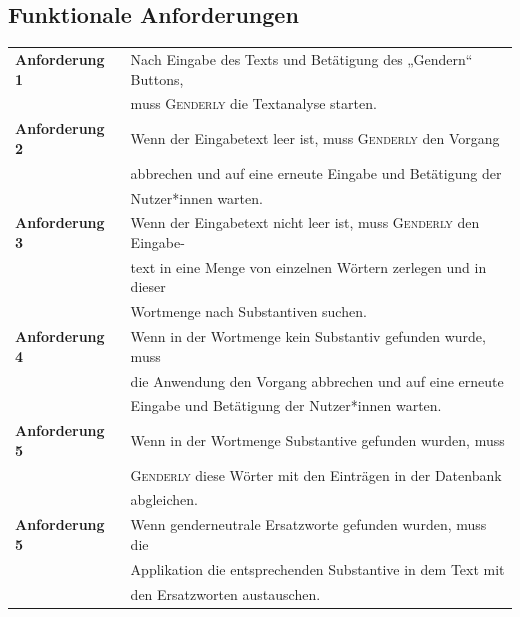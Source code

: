 \documentclass[paper=a4, parskip=half]{scrreprt}
\newcommand{\Genderly}{\textsc{Genderly}}
\begin{document}
\subsection{Funktionale Anforderungen}
\begin{table}[!htb]
\begin{tabular}{ll}
\textbf{Anforderung 1} & Nach Eingabe des Texts und Betätigung des „Gendern“ Buttons, \\
& muss \Genderly{} die Textanalyse starten. \vspace{0.15cm} \\
\textbf{Anforderung 2} & Wenn der Eingabetext leer ist, muss \Genderly{} den Vorgang \\
& abbrechen und auf eine erneute Eingabe und Betätigung der \\
& Nutzer*innen warten. \vspace{0.15cm} \\
\textbf{Anforderung 3} & Wenn der Eingabetext nicht leer ist, muss \Genderly{} den Eingabe- \\
& text in eine Menge von einzelnen Wörtern zerlegen und in dieser \\
& Wortmenge nach Substantiven suchen. \vspace{0.15cm} \\
\textbf{Anforderung 4} & Wenn in der Wortmenge kein Substantiv gefunden wurde, muss \\
& die Anwendung den Vorgang abbrechen und auf eine erneute \\
& Eingabe und Betätigung der Nutzer*innen warten. \vspace{0.15cm} \\
\textbf{Anforderung 5} & Wenn in der Wortmenge Substantive gefunden wurden, muss \\
& \Genderly{} diese Wörter mit den Einträgen in der Datenbank \\
& abgleichen. \vspace{0.15cm} \\
\textbf{Anforderung 5} & Wenn genderneutrale Ersatzworte gefunden wurden, muss die \\
& Applikation die entsprechenden Substantive in dem Text mit \\
& den Ersatzworten austauschen. \vspace{0.15cm} \\
\end{tabular}
\end{table}

\pagebreak
\end{document}

